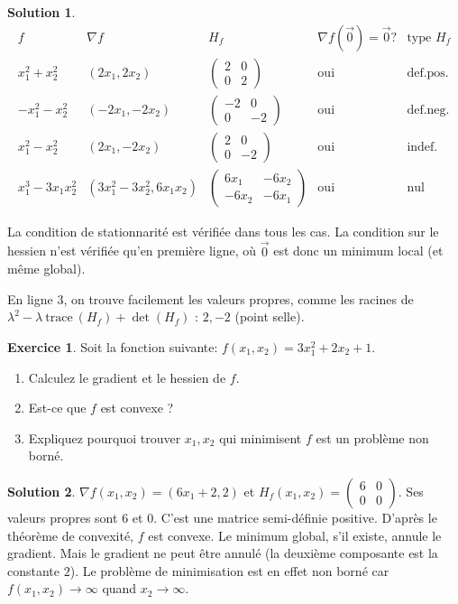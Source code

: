 \documentclass[a4paper,francais]{article}
\theoremstyle{definition}
\newtheorem{exercice}{Exercice}[section]
\newtheorem*{solution}{Solution}
\begin{document}
\begin{solution}
  \[
  \begin{array}{c|c|c|c|c}
    f & {\nabla f} & H_f & {\nabla f}(\vec{0}) = \vec{0}? & \text{type $H_f$} \\ \hline
    x_1^2 + x_2^2 & (2x_1,2x_2)  & \begin{pmatrix} 2 & 0 \\ 0 & 2 \end{pmatrix} & \text{oui} & \text{def.pos.}  \\
    -x_1^2 - x_2^2 & (-2x_1,-2x_2) & \begin{pmatrix} -2 & 0 \\ 0 & -2 \end{pmatrix} & \text{oui} & \text{def.neg.}\\
    x_1^2 - x_2^2 & (2x_1,-2x_2) & \begin{pmatrix} 2 & 0 \\ 0 & -2 \end{pmatrix} & \text{oui} & \text{indef.} \\
    x_1^3 - 3x_1x_2^2 & (3x_1^2 - 3x_2^2, 6x_1x_2) & \begin{pmatrix} 6x_1 & -6x_2 \\ -6x_2 & -6x_1 \end{pmatrix} & \text{oui} & \text{nul}
  \end{array}
  \]

  La condition de stationnarité est vérifiée dans tous les cas. 
  La condition sur le hessien n'est vérifiée qu'en première ligne, où $\vec{0}$ est donc un minimum
  local (et même global).

  En ligne 3, on trouve facilement les valeurs propres, comme les racines
  de $\lambda^2 - \lambda \ \text{trace} \ (H_f) + \det{(H_f)}$ : $2,-2$ (point selle). 
\end{solution}

\begin{exercice}
  Soit la fonction suivante: $f(x_1,x_2) = 3x_1^2 + 2x_2 + 1$.
  \begin{enumerate}
  \item Calculez le gradient et le hessien de $f$. 
  \item Est-ce que $f$ est convexe ?
  \item Expliquez pourquoi trouver $x_1,x_2$ qui minimisent $f$
    est un problème non borné.
  \end{enumerate}
\end{exercice}

\begin{solution}
  $\nabla f(x_1,x_2) = (6x_1 + 2, 2)$ et $H_f(x_1,x_2) = \begin{pmatrix} 6 & 0 \\ 0 & 0 \end{pmatrix}$.
  Ses valeurs propres sont $6$ et $0$. C'est une matrice semi-définie positive. D'après le théorème de
  convexité, $f$ est convexe. Le minimum global, s'il existe, annule le gradient. Mais le gradient ne
  peut être annulé (la deuxième composante est la constante $2$). Le problème de minimisation est
  en effet non borné car $f(x_1,x_2) \rightarrow \infty$ quand $x_2 \rightarrow \infty$.   
\end{solution}
\end{document}
